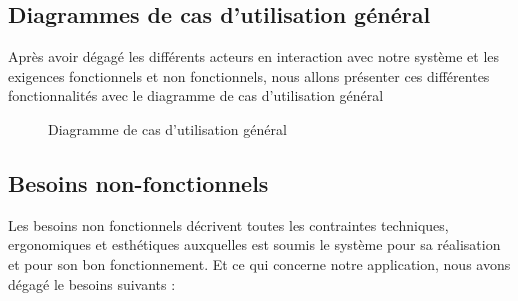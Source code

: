 \subsection{Diagrammes de cas d’utilisation général}
Après avoir dégagé les différents acteurs en interaction avec notre système et les exigences fonctionnels et non fonctionnels, nous allons présenter ces différentes fonctionnalités avec le diagramme de cas d’utilisation général 
\begin{figure}[H]
\centering
{}
\caption{Diagramme de cas d’utilisation général}
\end{figure}

\subsection{Besoins non-fonctionnels}
Les besoins non fonctionnels décrivent toutes les contraintes techniques, ergonomiques et esthétiques auxquelles est soumis le système pour sa réalisation et pour son bon fonctionnement. Et ce qui concerne notre application, nous avons dégagé le besoins suivants :

